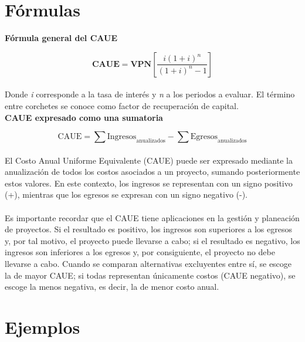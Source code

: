 \newpage
\section{Fórmulas}
\textbf{Fórmula general del CAUE}\newline

\begin{equation*}
	\textbf{CAUE} = \textbf{VPN}\left[ \frac{i(1+i)^n}{(1+i)^n-1}\right]
\end{equation*}
\\
Donde \textit{i} corresponde a la tasa de interés y \textit{n} a los periodos a evaluar. El término entre corchetes se conoce como factor de recuperación de capital.
\\

\textbf{CAUE expresado como una sumatoria}\newline

\begin{equation*}
	\text{CAUE} = \sum \text{Ingresos}_{\text{anualizados}} - \sum \text{Egresos}_{\text{anualizados}}
\end{equation*}
\\
El Costo Anual Uniforme Equivalente (CAUE) puede ser expresado mediante la anualización de todos los costos asociados a un proyecto, sumando posteriormente estos valores. En este contexto, los ingresos se representan con un signo positivo (+), mientras que los egresos se expresan con un signo negativo (-).
\\\\
Es importante recordar que el CAUE tiene aplicaciones en la gestión y planeación de proyectos. Si el resultado es positivo, los ingresos son superiores a los egresos y, por tal motivo, el proyecto puede llevarse a cabo; si el resultado es negativo, los ingresos son inferiores a los egresos y, por consiguiente, el proyecto no debe llevarse a cabo. Cuando se comparan alternativas excluyentes entre sí, se escoge la de mayor CAUE; si todas representan únicamente costos (CAUE negativo), se escoge la menos negativa, es decir, la de menor costo anual.

\section{Ejemplos}







